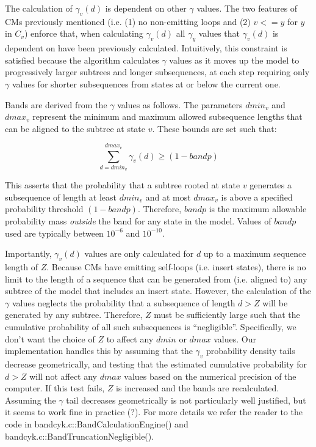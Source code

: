 \documentclass[11pt]{article}
\begin{document}
The calculation of $\gamma_v(d)$ is dependent on other $\gamma$
values. The two features of CMs previously mentioned (i.e. (1) no
non-emitting loops and (2) $v <= y$ for $y$ in $C_v$) enforce
that, when calculating $\gamma_v(d)$ all $\gamma_y$ values that
$\gamma_v(d)$ is dependent on have been previously calculated. 
Intuitively, this constraint is satisfied because the algorithm
calculates $\gamma$ values as it moves up the model to progressively
larger subtrees and longer subsequences, at each step requiring only
$\gamma$ values for shorter subsequences from states at or below the
current one. 

Bands are derived from the $\gamma$ values as follows.
The parameters $dmin_v$ and $dmax_v$ represent the minimum and maximum
allowed subsequence lengths that can be aligned to the subtree
at state $v$. These bounds are set such that: 

\[
\sum_{d = dmin_v}^{dmax_v} \gamma_v(d) \geq (1-bandp)
\]

This asserts that the probability that a subtree
rooted at state $v$ generates a subsequence of length at least
$dmin_v$ and at most $dmax_v$ is above a specified probability
threshold $(1-bandp)$. Therefore, $bandp$ is the maximum allowable
probability mass \emph{outside} the band for any state in the
model. Values of $bandp$ used are typically between $10^{-6}$ and
$10^{-10}$. 

Importantly, $\gamma_v(d)$ values are only calculated for $d$ up to a
maximum sequence length of $Z$. Because CMs have emitting self-loops
(i.e. insert states), there is no limit to the length of a sequence
that can be generated from (i.e. aligned to) any subtree of the model
that includes an insert state. However, the calculation of the
$\gamma$ values neglects the probability that a subsequence
of length $d > Z$ will be generated by any subtree.
Therefore, $Z$ must be sufficiently large such that the cumulative
probability of all such subsequences is ``negligible''. Specifically,
we don't want the choice of $Z$ to affect any $dmin$ or
$dmax$ values. Our implementation handles this by assuming that
the $\gamma_v$ probability density tails decrease geometrically, and
testing that the estimated cumulative probability for $d > Z$ will
not affect any $dmax$ values based on the numerical precision of the
computer. If this test fails, $Z$ is increased and the bands are
recalculated. Assuming the $\gamma$ tail decreases geometrically is not
particularly well justified, but it seems to work fine in
practice (?). For more details we refer the reader to the code in
bandcyk.c::BandCalculationEngine() and
bandcyk.c::BandTruncationNegligible().
\end{document}
